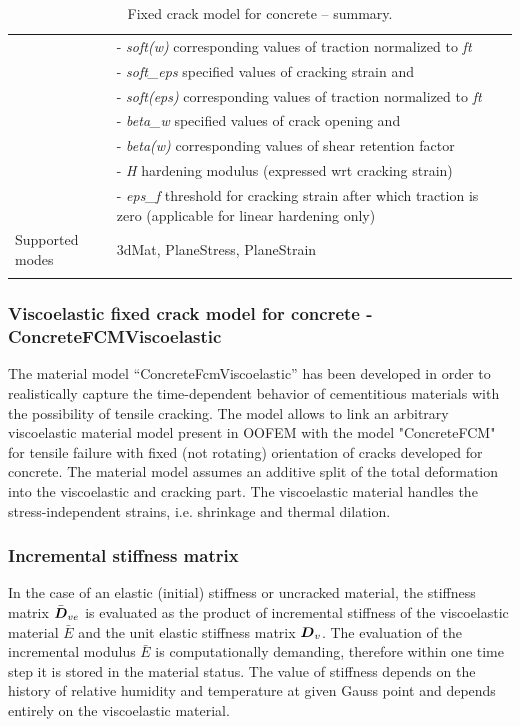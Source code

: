 \documentclass[a4paper]{article}
\newcommand{\mbf}[1]{\mbox{\boldmath$#1$}}
\newcommand{\param}[1]{{\it #1}}
\begin{document}
\begin{longtable}{|l|p{9cm}|}
&- \param{soft(w)} corresponding values of traction normalized to \param{ft}\\
&- \param{soft\_eps} specified values of cracking strain and \\
&- \param{soft(eps)} corresponding values of traction normalized to \param{ft}\\
&- \param{beta\_w} specified values of crack opening and \\
&- \param{beta(w)} corresponding values of shear retention factor\\
&- \param{H} hardening modulus (expressed wrt cracking strain)\\
&- \param{eps\_f} threshold for cracking strain after which traction is zero (applicable for linear hardening only) \\
Supported modes& 3dMat, PlaneStress, PlaneStrain\\
\hline
\caption{Fixed crack model for concrete -- summary.}
\label{concrete_fcm_table}
\end{longtable}


\subsubsection{Viscoelastic fixed crack model for concrete - ConcreteFCMViscoelastic}
\label{concreteFCMViscoelastic}

The material model ``ConcreteFcmViscoelastic'' has been developed in order to
realistically capture the time-dependent behavior of cementitious materials
with the possibility of tensile cracking.
The model allows to link an arbitrary
viscoelastic material model present in OOFEM with the model "ConcreteFCM" for
tensile failure with fixed (not rotating) orientation of cracks
developed for concrete. The material model assumes an additive split of the total deformation
into the viscoelastic and cracking part. The viscoelastic material handles the
stress-independent strains, i.e. shrinkage and thermal dilation.

\subsubsection*{Incremental stiffness matrix}
In the case of an elastic (initial) stiffness or uncracked material, the
stiffness matrix $\bar{\mbf{D}}_{ve}$ is evaluated as the product of incremental stiffness of the
viscoelastic material $\bar{E}$ and the unit elastic
stiffness matrix $\mbf{D}_v$.
The evaluation of the incremental modulus $\bar{E}$ is
computationally demanding, therefore within one time step it is stored
in the material status. The value of stiffness depends on the history
  of relative humidity and temperature at given Gauss point and
  depends entirely on the viscoelastic material.
\end{document}
